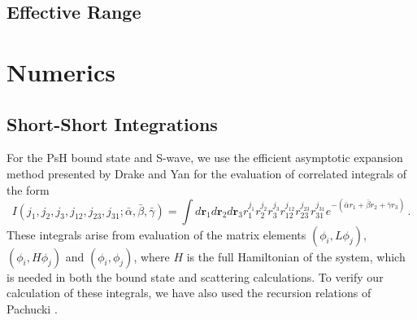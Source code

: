 \documentclass[preprint,showpacs,preprintnumbers,amsmath,amssymb]{revtex4}
\newcommand{\todoi}{\todo[inline]}
\begin{document}
\subsection{Effective Range}


\section{Numerics}
\label{sec:Numerical}

\subsection{Short-Short Integrations}
\label{sec:ShortInt}
For the PsH bound state and S-wave, we use the efficient asymptotic expansion method presented by Drake and Yan \cite{Drake1995} for the evaluation of correlated integrals of the form
\begin{equation}
\label{eq:ShortInt}
I(j_1,j_2,j_3,j_{12},j_{23},j_{31}; \bar{\alpha}, \bar{\beta}, \bar{\gamma}) =
\int
d \textbf{r}_1 d \textbf{r}_2 d \textbf{r}_3
r_1^{j_1} r_2^{j_2} r_3^{j_3} r_{12}^{j_{12}}
r_{23}^{j_{23}} r_{31}^{j_{31}}
e^{-(\bar{\alpha} r_1 + \bar{\beta} r_2 + \bar{\gamma} r_3)}\, .
\end{equation}
These integrals arise from evaluation of the matrix elements $(\phi_i, L \phi_j)$, $(\phi_i, H \phi_j)$ and $(\phi_i, \phi_j)$, where $H$ is the full Hamiltonian of the system,
which is needed in both the bound state and scattering calculations. To verify our calculation of these integrals, we have also used the recursion relations of Pachucki \cite{Pachucki2004}.
\end{document}
